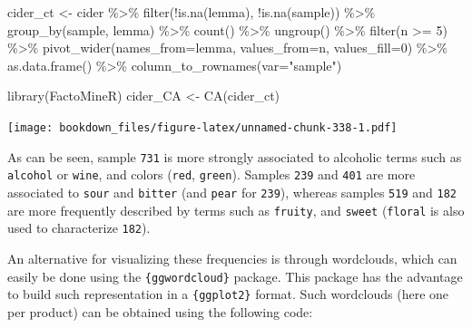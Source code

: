 \documentclass[
]{krantz}
\makeatletter
\newenvironment{Shaded}{\begin{snugshade}}{\end{snugshade}}
\newcommand{\AttributeTok}[1]{\textcolor[rgb]{0.61,0.61,0.61}{#1}}
\newcommand{\DecValTok}[1]{\textcolor[rgb]{0.06,0.06,0.06}{#1}}
\newcommand{\FunctionTok}[1]{\textcolor[rgb]{0,0,0}{#1}}
\newcommand{\NormalTok}[1]{#1}
\newcommand{\OtherTok}[1]{\textcolor[rgb]{0.37,0.37,0.37}{#1}}
\newcommand{\SpecialCharTok}[1]{\textcolor[rgb]{0,0,0}{#1}}
\newcommand{\StringTok}[1]{\textcolor[rgb]{0.5,0.5,0.5}{#1}}
\newenvironment{kframe}{%
\medskip{}
\setlength{\fboxsep}{.8em}
 \def\at@end@of@kframe{}%
 \ifinner\ifhmode%
  \def\at@end@of@kframe{\end{minipage}}%
  \begin{minipage}{\columnwidth}%
 \fi\fi%
 \def\FrameCommand##1{\hskip\@totalleftmargin \hskip-\fboxsep
 \colorbox{shadecolor}{##1}\hskip-\fboxsep
     \hskip-\linewidth \hskip-\@totalleftmargin \hskip\columnwidth}%
 \MakeFramed {\advance\hsize-\width
   \@totalleftmargin\z@ \linewidth\hsize
   \@setminipage}}%
 {\par\unskip\endMakeFramed%
 \at@end@of@kframe}
\renewenvironment{Shaded}{\begin{kframe}}{\end{kframe}}
\makeatother
\begin{document}
\begin{Shaded}
\begin{Highlighting}[]
\NormalTok{cider\_ct }\OtherTok{\textless{}{-}}\NormalTok{ cider }\SpecialCharTok{\%\textgreater{}\%} 
  \FunctionTok{filter}\NormalTok{(}\SpecialCharTok{!}\FunctionTok{is.na}\NormalTok{(lemma), }\SpecialCharTok{!}\FunctionTok{is.na}\NormalTok{(sample)) }\SpecialCharTok{\%\textgreater{}\%} 
  \FunctionTok{group\_by}\NormalTok{(sample, lemma) }\SpecialCharTok{\%\textgreater{}\%} 
  \FunctionTok{count}\NormalTok{() }\SpecialCharTok{\%\textgreater{}\%} 
  \FunctionTok{ungroup}\NormalTok{() }\SpecialCharTok{\%\textgreater{}\%} 
  \FunctionTok{filter}\NormalTok{(n }\SpecialCharTok{\textgreater{}=} \DecValTok{5}\NormalTok{) }\SpecialCharTok{\%\textgreater{}\%} 
  \FunctionTok{pivot\_wider}\NormalTok{(}\AttributeTok{names\_from=}\NormalTok{lemma, }\AttributeTok{values\_from=}\NormalTok{n, }\AttributeTok{values\_fill=}\DecValTok{0}\NormalTok{) }\SpecialCharTok{\%\textgreater{}\%} 
  \FunctionTok{as.data.frame}\NormalTok{() }\SpecialCharTok{\%\textgreater{}\%} 
  \FunctionTok{column\_to\_rownames}\NormalTok{(}\AttributeTok{var=}\StringTok{"sample"}\NormalTok{)}

\FunctionTok{library}\NormalTok{(FactoMineR)}
\NormalTok{cider\_CA }\OtherTok{\textless{}{-}} \FunctionTok{CA}\NormalTok{(cider\_ct)}
\end{Highlighting}
\end{Shaded}

\texttt{[image: bookdown\_files/figure-latex/unnamed-chunk-338-1.pdf]}

As can be seen, sample \texttt{731} is more strongly associated to alcoholic terms such as \texttt{alcohol} or \texttt{wine}, and colors (\texttt{red}, \texttt{green}). Samples \texttt{239} and \texttt{401} are more associated to \texttt{sour} and \texttt{bitter} (and \texttt{pear} for \texttt{239}), whereas samples \texttt{519} and \texttt{182} are more frequently described by terms such as \texttt{fruity}, and \texttt{sweet} (\texttt{floral} is also used to characterize \texttt{182}).

An alternative for visualizing these frequencies is through wordclouds, which can easily be done using the \texttt{\{ggwordcloud\}} package. This package has the advantage to build such representation in a \texttt{\{ggplot2\}} format. Such wordclouds (here one per product) can be obtained using the following code:
\end{document}
